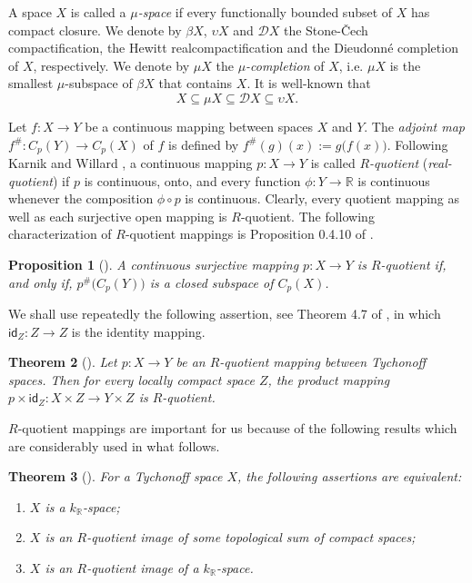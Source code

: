 \documentclass[preprint,11pt]{elsarticle}
\newtheorem{theorem}{Theorem}[section]
\newtheorem{proposition}[theorem]{Proposition}
\numberwithin{equation}{section}
\numberwithin{theorem}{section}
\newcommand{\IR}{\mathbb{R}}
\newcommand{\DD}{\mathcal{D}}
\newcommand{\Id}{\mathsf{id}}
\begin{document}
A space $X$ is called a {\em $\mu$-space} if every functionally bounded subset of $X$ has compact closure. We denote by $\beta X$, $\upsilon X$ and  $\mathcal{D} X$ the Stone-\v{C}ech compactification, the Hewitt realcompactification and the Dieudonn\'{e} completion of $X$, respectively. We denote by $\mu X$ the {\em $\mu$-completion} of $X$, i.e. $\mu X$  is the smallest $\mu$-subspace of $\beta X$ that contains $X$.
It is well-known that
\[
X\subseteq \mu X\subseteq \DD X \subseteq \upsilon X.
\]


Let  $f:X\to Y$ be a continuous mapping between spaces $X$ and $Y$. The {\em adjoint map} $f^{\#}:C_p(Y)\to C_p(X)$ of $f$ is defined by $f^{\#}(g)(x):=g\big(f(x)\big)$.
Following Karnik and Willard \cite{Kar-Wil}, a continuous mapping $p:X\to Y$ is called {\em $R$-quotient} ({\em real-quotient}) if $p$ is continuous, onto, and every function $\phi:Y\to\IR$ is continuous whenever the composition $\phi\circ p$ is continuous. Clearly, every quotient mapping as well as each surjective open mapping is $R$-quotient. The following characterization of $R$-quotient mappings is Proposition 0.4.10 of \cite{Arhangel}.
\begin{proposition}[\cite{Arhangel}] \label{p:R-quotient-characterization}
A continuous surjective mapping $p:X\to Y$ is $R$-quotient if, and only if, $p^{\#}\big(C_p(Y)\big)$ is a closed subspace of $C_p(X)$.
\end{proposition}


We shall use repeatedly the following assertion, see Theorem 4.7 of \cite{Oku-Par}, in which $\Id_Z:Z\to Z$ is the identity mapping.
\begin{theorem}[\cite{Oku-Par}] \label{t:rq-prod}
Let $p:X\to Y$ be an $R$-quotient mapping between Tychonoff spaces. Then for every locally compact space $Z$, the product mapping $p\times\Id_Z:X\times Z\to Y\times Z$ is $R$-quotient.
\end{theorem}

$R$-quotient mappings are important for us because of the following results which are considerably used in what follows.

\begin{theorem}[{\protect\cite[Theorem~6.1]{GR-kR-sR}}] \label{t:characterization-kR}
For a Tychonoff space $X$, the following assertions are equivalent:
\begin{enumerate}
\item[{\rm(i)}] $X$ is a $k_\IR$-space;
\item[{\rm(ii)}]  $X$ is an $R$-quotient image of some topological sum of compact spaces;
\item[{\rm(iii)}]  $X$ is an $R$-quotient  image of a $k_\IR$-space.
\end{enumerate}
\end{theorem}
\end{document}
